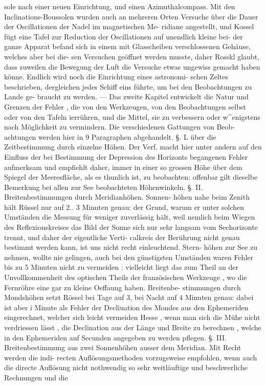 \documentclass[12pt,a4paper]{article}
\begin{document}
sole  nach  einer  neuen  Einrichtung,  und  einen  Azimuthalcompass.     Mit  den  Inclinations-Boussolen  wurden auch   an    mehreren  Orten  Versuche   über   die   Dauer  der  Oscillationen  der  Nadel   im   magnetischen  Me- ridiane angestellt,  und  Kossel  fügt  eine  Tafel  zur  Reduction  der  Oscillationen  auf  unendlich  kleine  bei- der ganze  Apparat  befand  sich  in  einem  mit  Glasscheiben  verschlossenen  Gehäuse,  welches  aber  bei  die- sen Versuchen  geöffnet  werden  musste,  daher  Rosskl  glaubt,  dass  zuweilen  die  Bewegung  der  Luft  die Versuche  etwas  ungewiss  gemacht  haben  könne.      Endlich   wird   noch  die   Einrichtung  eines  astronomi- schen Zeltes  beschrieben,  dergleichen  jedes  Schiff  eins  führte,  um  bei  den  Beobachtungen  zu  Lande  ge- braucht zu  werden.  ---     Das  zweite  Kapitel  entwickelt  die  Natur  und  Grenzen  der  Fehler ,  die  von  den Werkzeugen,    von  den  Beobachtungen  selbst   oder  von  den  Tafeln  ierrühren,    und    die    Mittel,    sie    zu verbessern  oder  w\textasciicircum{}enigstens  nach  Möglichkeit  zu  vermindern.     Die   verschiedenen  Gattungen   von  Beob- achtungen werden  hier  in  9  Paragraphen  abgehandelt.      §.  L    über   die  Zeitbestimmung  durch   einzelne Höhen.      Der  Verf.  macht  hier  unter  andern  auf  den  Einfluss  der    bei  Bestimmung  der    Depression  des Horizonts  begangenen  Fehler    aufmerksam   und  empfiehlt  daher,   immer   in  einer  so  grossen  Höhe  über dem  Spiegel  der  Meeresfläche,  als  es  thunlich  ist,  zu  beobachten:  offenbar  gilt  dieselbe  Bemerkung  bei allen  zur  See  beobachteten  Höhenwinkeln.     §.  II.  Breitenbestimmungen  durch  Meridianhöhen.     Sonnen- höhen nahe  beim  Zenith  hält  Rüssel  nur  auf  2.. 3  Minuten  genau:  der  Grund,  warum  er  unter  solchen Umständen  die  Messung  für  weniger  zuverlässig  hält,    weil  nemlich  beim  Wiegen   des  Reflexionskreises das  Bild  der  Sonne  sich  nur  sehr  langsam  vom  Seehorizonte  trennt,    und   daher   der   eigentliche  Verti- calkreis  der  Berührung  nicht  genau  bestimmt  werden  kann,    ist   uns   nicht  recht  einleuchtend.      Stern- höhen zur  See  zu  nehmen,  wollte  nie  gelingen,    auch  bei  den  günstigsten  Umständen  waren  Fehler  bis zu  5  Minuten  nicht  zu  vermeiden :  vielleicht  liegt  das  zum  Theil  an  der  Unvollkommenheit  des  optischen Theils   der  französischen  Werkzeuge ,    wo  die  Fernröhre  eine  gar  zu  kleine  Oeffaung  haben.     Breitenbe- stimmungen durch  Mondshöhen  setzt  Rössel  bei  Tage  auf  3,  bei  Nacht  auf  4  Minuten  genau:  dabei  ist aber  i  Minute  als  Fehler  der  Decliuation  des  Mondes  aus  den  Ephemeriden  eingerechnet,    welcher  sich leicht  vermeiden  Hesse ,  wenn  man  sich  die  Mühe  nicht  verdriessen  lässt ,  die  Declination  aus  der  Länge und  Breite   zu  berechnen ,    welche   in   den    Ephemeriden   auf  Secunden   angegeben  zu  werden  pflegen. §.  III.  Breitenbestimmung  aus   zwei   Sonnenhöhen  ausser   dem  Meridian.      Mit  Recht   werden   die  indi- recten  Auflösungsmethoden  vorzugsweise  empfohlen,  wenn  auch  die  directe  Auflösung  nicht  nothwendig so  sehr  weitläuftige  und  beschwerliche  Rechnungen  und  die  
\end{document}

